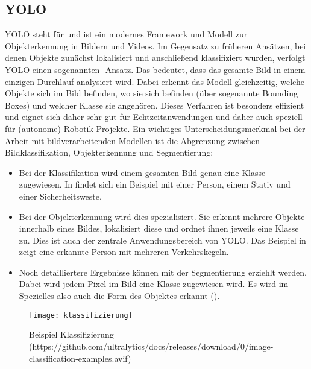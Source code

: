 \subsection{YOLO}
YOLO steht für  und ist ein modernes Framework und Modell zur Objekterkennung in Bildern und Videos. 
Im Gegensatz zu früheren Ansätzen, bei denen Objekte zunächst lokalisiert und anschließend klassifiziert wurden, verfolgt YOLO einen sogenannten -Ansatz. 
Das bedeutet, dass das gesamte Bild in einem einzigen Durchlauf analysiert wird. 
Dabei erkennt das Modell gleichzeitig, welche Objekte sich im Bild befinden, wo sie sich befinden (über sogenannte Bounding Boxes) und welcher Klasse sie angehören. 
Dieses Verfahren ist besonders effizient und eignet sich daher sehr gut für Echtzeitanwendungen und daher auch speziell für (autonome) Robotik-Projekte.
\newPar
Ein wichtiges Unterscheidungsmerkmal bei der Arbeit mit bildverarbeitenden Modellen ist die Abgrenzung zwischen Bildklassifikation, Objekterkennung und Segmentierung: 
\begin{itemize}
\item 
Bei der Klassifikation wird einem gesamten Bild genau eine Klasse zugewiesen. In  findet sich ein Beispiel mit einer Person, einem Stativ und einer Sicherheitsweste.

\item
Bei der Objekterkennung wird dies spezialisiert. Sie erkennt mehrere Objekte innerhalb eines Bildes, lokalisiert diese und ordnet ihnen jeweils eine Klasse zu. 
Dies ist auch der zentrale Anwendungsbereich von YOLO. Das Beispiel in  zeigt eine erkannte Person mit mehreren Verkehrskegeln.

\item
Noch detailliertere Ergebnisse können mit der Segmentierung erziehlt werden. Dabei wird jedem Pixel im Bild eine Klasse zugewiesen wird. 
Es wird im Spezielles also auch die Form des Objektes erkannt ().

\end{itemize}

\begin{figure}[H]
    \centering
    \texttt{[image: klassifizierung]}
    \caption[Beispiel Klassifizierung]{Beispiel Klassifizierung (https://github.com/ultralytics/docs/releases/download/0/image-classification-examples.avif)}\label{beispiel_klassifizierung}
\end{figure}

